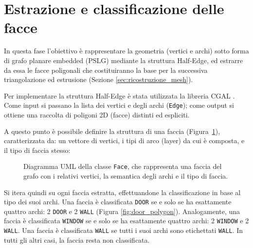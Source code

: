 \section{Estrazione e classificazione delle facce}
\label{sec:estrazione_classificazione_facce}

In questa fase l'obiettivo è rappresentare la geometria (vertici e archi) sotto forma di grafo planare embedded (PSLG) mediante la struttura Half-Edge, ed estrarre da essa le facce poligonali che costituiranno la base per la successiva triangolazione ed estrusione (Sezione \ref{sec:ricostruzione_mesh}).

Per implementare la struttura Half-Edge è stata utilizzata la libreria CGAL \cite{cgal}. Come input si passano la lista dei vertici e degli archi (\texttt{Edge}); come output si ottiene una raccolta di poligoni 2D (facce) distinti ed espliciti.

A questo punto è possibile definire la struttura di una faccia (Figura~\ref{fig:face-uml}), caratterizzata da: un vettore di vertici, i tipi di arco (layer) da cui è composta, e il tipo di faccia stesso:

\begin{figure}[H]
	\centering
	\caption{Diagramma UML della classe \texttt{Face}, che rappresenta una faccia del grafo con i relativi vertici, la semantica degli archi e il tipo di faccia.}
	\label{fig:face-uml}
\end{figure}

Si itera quindi su ogni faccia estratta, effettuandone la classificazione in base al tipo dei suoi archi. Una faccia è classificata \texttt{DOOR} se e solo se ha esattamente quattro archi: 2 \texttt{DOOR} e 2 \texttt{WALL} (Figura \ref{fig:door_polygon}). Analogamente, una faccia è classificata \texttt{WINDOW} se e solo se ha esattamente quattro archi: 2 \texttt{WINDOW} e 2 \texttt{WALL}. Una faccia è classificata \texttt{WALL} se tutti i suoi archi sono etichettati \texttt{WALL}. In tutti gli altri casi, la faccia resta non classificata.

